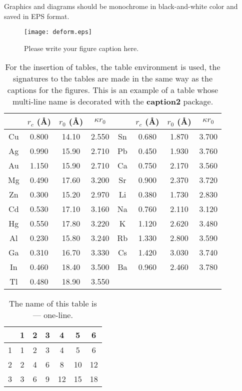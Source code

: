 \documentclass[
11pt,%
tightenlines,%
twoside,%
onecolumn,%
nofloats,%
nobibnotes,%
nofootinbib,%
superscriptaddress,%
noshowpacs,%
centertags]%
{revtex4}
\begin{document}
Graphics and diagrams should be monochrome in black-and-white color and saved in EPS format.
\begin{figure}[h]
\setcaptionmargin{5mm}
\onelinecaptionstrue  %
\texttt{[image: deform.eps]}
\caption{Please write your figure caption here.}\label{fig:1}
\end{figure}

\begin{table}[!h]
\setcaptionmargin{0mm}
\onelinecaptionsfalse
{}
\caption{ For the insertion of tables, the table environment is used,
 the signatures to the tables are made in the same way as the captions
 for the figures. This is an example of a table whose multi-line name
 is decorated with the \textbf{caption2} package.}
\bigskip
\begin{tabular}{|c|c|c|c|c|c|c|c|}
\hline
 &$r_c$ (\AA)&$r_0$ (\AA)&$\kappa r_0$&
 &$r_c$ (\AA) &$r_0$ (\AA)&$\kappa r_0$\\
\hline
Cu& 0.800 & 14.10 & 2.550 &Sn
& 0.680 & 1.870 & 3.700 \\
Ag& 0.990 & 15.90 & 2.710 &Pb
& 0.450 & 1.930 & 3.760 \\
Au& 1.150 & 15.90 & 2.710 &Ca
& 0.750 & 2.170 & 3.560 \\
Mg& 0.490 & 17.60 & 3.200 &Sr
& 0.900 & 2.370 & 3.720 \\
Zn& 0.300 & 15.20 & 2.970 &Li
& 0.380 & 1.730 & 2.830 \\
Cd& 0.530 & 17.10 & 3.160 &Na
& 0.760 & 2.110 & 3.120 \\
Hg& 0.550 & 17.80 & 3.220 &K &  1.120 & 2.620 & 3.480 \\
Al& 0.230 & 15.80 & 3.240 &Rb & 1.330 & 2.800 & 3.590 \\
Ga& 0.310 & 16.70 & 3.330 &Cs & 1.420 & 3.030 & 3.740 \\
In& 0.460 & 18.40 & 3.500 &Ba & 0.960 & 2.460 & 3.780 \\
Tl& 0.480 & 18.90 & 3.550 & & & & \\[1mm]
\hline
\end{tabular}
\end{table}

\begin{table}[!htb]
\setcaptionmargin{0mm}
\onelinecaptionstrue
{}
\caption{The name of this table is --- one-line.}
\bigskip
\begin{tabular}{|c|c|c|c|c|c|c|}
  \hline
    & 1 & 2 & 3 & 4 & 5 & 6\\
  \hline
  1 & 1 & 2 & 3 & 4 & 5 & 6\\
  2 & 2 & 4 & 6 & 8 & 10 & 12\\
  3 & 3 & 6 & 9 & 12 & 15 & 18\\[1mm]
  \hline
\end{tabular}
\end{table}
\end{document}
